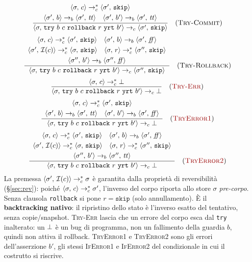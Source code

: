 \[
\dfrac{\begin{array}{c}
       \cfg{c}{\sigma} \toc^{*} \cfg{\mathtt{skip}}{\sigma'}\\[0.3em]
       \cfg{b}{\sigma'} \tob \cfg{\ttt}{\sigma'} \quad \cfg{b'}{\sigma'} \tob \cfg{\ttt}{\sigma'}
       \end{array}}
      {\cfg{\mathtt{try}\ b\ c\ \mathtt{rollback}\ r\ \mathtt{yrt}\ b'}{\sigma} \toc \cfg{\mathtt{skip}}{\sigma'}}
      \rname{Try-Commit}
\]
\[
\dfrac{\begin{array}{c}
       \cfg{c}{\sigma} \toc^{*} \cfg{\mathtt{skip}}{\sigma'} \quad \cfg{b}{\sigma'} \tob \cfg{\ff}{\sigma'}\\[0.3em]
       \cfg{\Inv{c}}{\sigma'} \toc^{*} \cfg{\mathtt{skip}}{\sigma} \quad \cfg{r}{\sigma} \toc^{*} \cfg{\mathtt{skip}}{\sigma''}\\[0.3em]
       \cfg{b'}{\sigma''} \tob \cfg{\ff}{\sigma''}
       \end{array}}
      {\cfg{\mathtt{try}\ b\ c\ \mathtt{rollback}\ r\ \mathtt{yrt}\ b'}{\sigma} \toc \cfg{\mathtt{skip}}{\sigma''}}
      \rname{Try-Rollback}
\]
\[
\dfrac{\cfg{c}{\sigma} \toc^{*} \err}
      {\cfg{\mathtt{try}\ b\ c\ \mathtt{rollback}\ r\ \mathtt{yrt}\ b'}{\sigma} \toc \err}
      \rnameerr{Try-Err}
\]
\[
\dfrac{\begin{array}{c}
       \cfg{c}{\sigma} \toc^{*} \cfg{\mathtt{skip}}{\sigma'}\\[0.3em]
       \cfg{b}{\sigma'} \tob \cfg{\ttt}{\sigma'} \quad \cfg{b'}{\sigma'} \tob \cfg{\ff}{\sigma'}
       \end{array}}
      {\cfg{\mathtt{try}\ b\ c\ \mathtt{rollback}\ r\ \mathtt{yrt}\ b'}{\sigma} \toc \err}
      \rnameerr{TryError1}
\]
\[
\dfrac{\begin{array}{c}
       \cfg{c}{\sigma} \toc^{*} \cfg{\mathtt{skip}}{\sigma'} \quad \cfg{b}{\sigma'} \tob \cfg{\ff}{\sigma'}\\[0.3em]
       \cfg{\Inv{c}}{\sigma'} \toc^{*} \cfg{\mathtt{skip}}{\sigma} \quad \cfg{r}{\sigma} \toc^{*} \cfg{\mathtt{skip}}{\sigma''}\\[0.3em]
       \cfg{b'}{\sigma''} \tob \cfg{\ttt}{\sigma''}
       \end{array}}
      {\cfg{\mathtt{try}\ b\ c\ \mathtt{rollback}\ r\ \mathtt{yrt}\ b'}{\sigma} \toc \err}
      \rnameerr{TryError2}
\]
La premessa $\cfg{\Inv{c}}{\sigma'} \toc^{*} \sigma$ è garantita dalla proprietà
di reversibilità (\S\ref{sec:rev}): poiché $\cfg{c}{\sigma} \toc^{*} \sigma'$,
l'inverso del corpo riporta allo store $\sigma$ \emph{pre-corpo}. Senza clausola
\texttt{rollback} si pone $r = \mathtt{skip}$ (solo annullamento). È il
\textbf{backtracking nativo}: il ripristino dello stato è l'inverso esatto del
tentativo, senza copie/snapshot. \textcolor{red!60!black}{\textsc{Try-Err}} lascia che un errore del
corpo esca dal \texttt{try} inalterato: un $\err$ è un bug di programma, non
un fallimento della guardia $b$, quindi non attiva il rollback.
\textcolor{red!60!black}{\textsc{TryError1}} e
\textcolor{red!60!black}{\textsc{TryError2}} sono gli errori dell'asserzione
$b'$, gli stessi \textsc{IfError1} e \textsc{IfError2} del condizionale in cui
il costrutto si riscrive.

